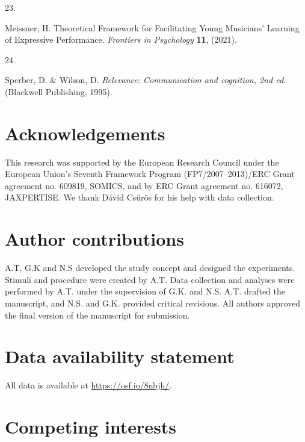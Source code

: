 \documentclass[
  man,floatsintext]{apa6}
\newlength{\cslhangindent}
\newlength{\csllabelwidth}
\newlength{\cslentryspacingunit} %
\newenvironment{CSLReferences}[2] %
 {%
  \setlength{\parindent}{0pt}
  \ifodd #1
  \let\oldpar\par
  \def\par{\hangindent=\cslhangindent\oldpar}
  \fi
  \setlength{\parskip}{#2\cslentryspacingunit}
 }%
 {}
\newcommand{\CSLLeftMargin}[1]{\parbox[t]{\csllabelwidth}{#1}}
\newcommand{\CSLRightInline}[1]{\parbox[t]{\linewidth - \csllabelwidth}{#1}\break}
\begin{document}
\begin{CSLReferences}{0}{0}
\leavevmode{}%
\CSLLeftMargin{23. }%
\CSLRightInline{Meissner, H. Theoretical {Framework} for {Facilitating Young Musicians}' {Learning} of {Expressive Performance}. \emph{Frontiers in Psychology} \textbf{11}, (2021).}

\leavevmode{}%
\CSLLeftMargin{24. }%
\CSLRightInline{Sperber, D. \& Wilson, D. \emph{Relevance: {Communication} and cognition, 2nd ed}. ({Blackwell Publishing}, 1995).}

\end{CSLReferences}

\endgroup

\hypertarget{acknowledgements}{%
\section{Acknowledgements}\label{acknowledgements}}

This research was supported by the European Research Council under the European Union's Seventh Framework Program (FP7/2007--2013)/ERC Grant agreement no. 609819, SOMICS, and by ERC Grant agreement no. 616072, JAXPERTISE. We thank Dávid Csűrös for his help with data collection.

\hypertarget{author-contributions}{%
\section{Author contributions}\label{author-contributions}}

A.T, G.K and N.S developed the study concept and designed the experiments. Stimuli and procedure were created by A.T. Data collection and analyses were performed by A.T. under the supervision of G.K. and N.S. A.T. drafted the manuscript, and N.S. and G.K. provided critical revisions. All authors approved the final version of the manuscript for submission.

\hypertarget{data-availability-statement}{%
\section{Data availability statement}\label{data-availability-statement}}

All data is available at \url{https://osf.io/8nbjh/}.

\hypertarget{competing-interests}{%
\section{Competing interests}\label{competing-interests}}
\end{document}
